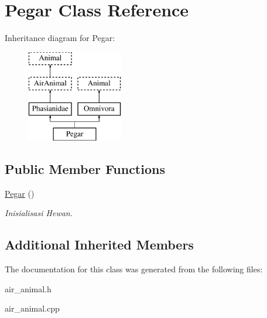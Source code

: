 \hypertarget{class_pegar}{}\section{Pegar Class Reference}
\label{class_pegar}
Inheritance diagram for Pegar\+:\begin{figure}[H]
\begin{center}
\leavevmode
\includegraphics[height=4.000000cm]{class_pegar}
\end{center}
\end{figure}
\subsection*{Public Member Functions}
\begin{DoxyCompactItemize}
\item 
\hyperlink{class_pegar_a80a57412765503be9356404071e2e5f9}{Pegar} ()\hypertarget{class_pegar_a80a57412765503be9356404071e2e5f9}{}\label{class_pegar_a80a57412765503be9356404071e2e5f9}

\begin{DoxyCompactList}\small\item\em Inisialisasi Hewan. \end{DoxyCompactList}\end{DoxyCompactItemize}
\subsection*{Additional Inherited Members}


The documentation for this class was generated from the following files\+:\begin{DoxyCompactItemize}
\item 
air\+\_\+animal.\+h\item 
air\+\_\+animal.\+cpp\end{DoxyCompactItemize}
